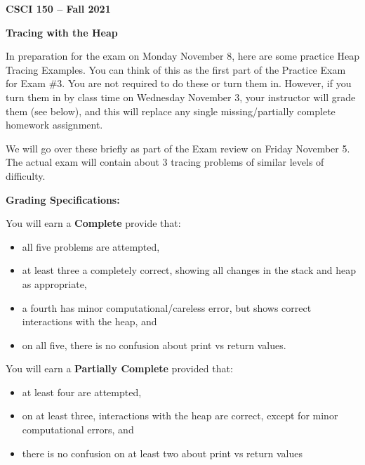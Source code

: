 \documentclass{article}
\begin{document}
\textbf{CSCI 150 -- Fall 2021}

\vspace{0.1in}

\begin{center}
  \textbf{Tracing with the Heap}
\end{center}

\vspace{0.2in}

In preparation for the exam on Monday November 8, here are some practice Heap Tracing Examples. You can think of this as the first part of the Practice Exam for Exam \#3. You are not required to do these or turn them in. However, if you turn them in by class time on Wednesday November 3, your instructor will grade them (see below), and this will replace any single missing/partially complete homework assignment. 

\vspace{0.1in}

We will go over these briefly as part of the Exam review on Friday November 5. The actual exam will contain about 3 tracing problems of similar levels of difficulty.

\vspace{0.2in}

\textbf{Grading Specifications:}

You will earn a \textbf{Complete} provide that:
\begin{itemize}
  \item all five problems are attempted,
  \item at least three a completely correct, showing all changes in the stack and heap as appropriate,  
  \item a fourth has minor computational/careless error, but shows correct interactions with the heap, and
  \item on all five, there is no confusion about print vs return values.
\end{itemize}

You will earn a \textbf{Partially Complete} provided that:
\begin{itemize}
  \item  at least four are attempted,
  \item  on at least three, interactions with the heap are correct, except for minor computational errors, and
  \item  there is no confusion on at least two about print vs return values
\end{itemize}
\end{document}
